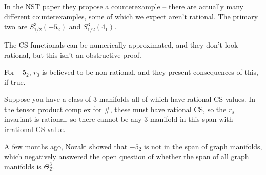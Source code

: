 \documentclass[main]{subfiles}
\begin{document}
In the NST paper they propose a counterexample -- there are actually many different counterexamples, some of which we expect aren't rational. The primary two are $S^3_{1/2}(-5_2)$ and $S^3_{1/2}(4_1)$.

The CS functionals can be numerically approximated, and they don't look rational, but this isn't an obstructive proof.

For $-5_2$, $r_0$ is believed to be non-rational, and they present consequences of this, if true.

Suppose you have a class of $3$-manifolds all of which have rational CS values. In the tensor product complex for $\#$, these must have rational CS, so the $r_s$ invariant is rational, so there cannot be any $3$-manifold in this span with irrational CS value.

A few months ago, Nozaki showed that $-5_2$ is not in the span of graph manifolds, which negatively answered the open question of whether the span of all graph manifolds is $\Theta^3_{\mathbb{Z}}$.
\end{document}
